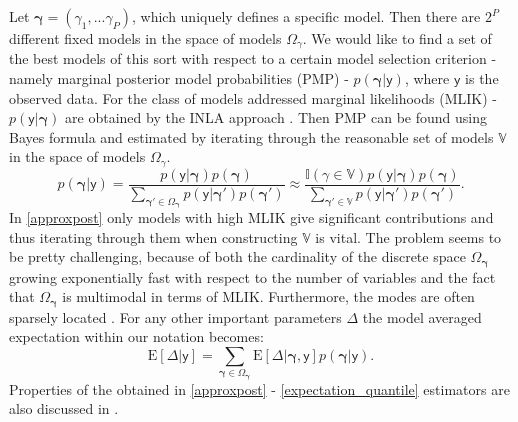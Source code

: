 \documentclass[a0,portrait]{a0poster}
\begin{document}
\begin{multicols}{2}
Let $\boldsymbol{\gamma} = (\gamma_1,...\gamma_P)$, which uniquely defines a specific model. Then there are $2^{P}$ different fixed  models in the space of models $\Omega_{\gamma}$. We would like to find a set of the best models of this sort with respect to a certain model selection criterion - namely marginal posterior model probabilities (PMP) - $p(\boldsymbol{\gamma}|\boldsymbol{\mathsf{y}})$,  where $\boldsymbol{\mathsf{y}}$ is the observed data. For the class of models addressed marginal likelihoods (MLIK) - $p(\boldsymbol{\mathsf{y}}|\boldsymbol{\gamma})$ are obtained by the INLA approach \cite{rue2009eINLA}. Then PMP can be found using Bayes formula and estimated by iterating through the reasonable set of models  $\mathbb{V}$  in the space of models $\Omega_{\gamma}$.
\begin{equation}\label{approxpost}
p(\boldsymbol{\gamma}|\boldsymbol{\mathsf{y}}) =  \frac{{p(\boldsymbol{\mathsf{y}}|\boldsymbol{\gamma})p(\boldsymbol{\gamma})}}{\sum_{\boldsymbol{\boldsymbol{\gamma}}' \in\Omega_{\boldsymbol{\gamma}}}{p(\boldsymbol{\mathsf{y}}| \boldsymbol{\gamma}')p(\boldsymbol{\gamma}')}}\approx\frac{{\mathbb{I}(\gamma \in \mathbb{V})p(\boldsymbol{\mathsf{y}}|\boldsymbol{\gamma})p(\boldsymbol{\gamma})}}{\sum_{\boldsymbol{\boldsymbol{\gamma}}' \in \mathbb{V}}{p(\boldsymbol{\mathsf{y}}| \boldsymbol{\gamma}')p(\boldsymbol{\gamma}')}}.
\end{equation}
In \eqref{approxpost} only models with high MLIK give significant contributions and thus iterating through them when constructing $\mathbb{V}$ is vital. The problem seems to be pretty challenging, because of both the cardinality of the discrete space $\Omega_{\boldsymbol{\gamma}}$ growing exponentially fast with respect to the number of variables and the fact that $\Omega_{\boldsymbol{\gamma}}$  is multimodal in terms of MLIK. Furthermore, the modes are often sparsely located \cite{Hubin2016}. 
For any other important parameters $\Delta$ the model averaged expectation within our notation becomes:
\begin{equation}\label{expectation_quantile}
\text{E}[\Delta|\boldsymbol{\mathsf{y}}] =  \sum_{\boldsymbol{\boldsymbol{\gamma}} \in\Omega_{\boldsymbol{\gamma}}}{\text{E}[\Delta|\boldsymbol{\gamma},\boldsymbol{\mathsf{y}}]p(\boldsymbol{\gamma}|\boldsymbol{\mathsf{y}})}.
\end{equation}
Properties of the obtained in \eqref{approxpost} - \eqref{expectation_quantile} estimators are also discussed in \cite{Hubin2016}.


\end{multicols}
\end{document}
